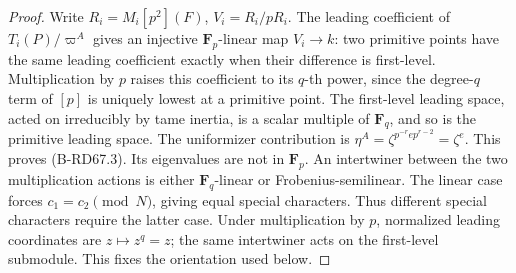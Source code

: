 \begin{proof}
Write \(R_i=M_i[p^2](F)\), \(V_i=R_i/pR_i\). The leading
coefficient of \(T_i(P)/\varpi^A\) gives an injective
\(\mathbf F_p\)-linear map \(V_i\to k\): two primitive points
have the same leading coefficient exactly when their difference
is first-level. Multiplication by \(p\) raises this coefficient
to its \(q\)-th power, since the degree-\(q\) term of \([p]\)
is uniquely lowest at a primitive point. The first-level leading
space, acted on irreducibly by tame inertia, is a scalar multiple
of \(\mathbf F_q\), and so is the primitive leading space.
The uniformizer contribution is
\(\eta^A=\zeta^{p^{-r}e p^{r-2}}=\zeta^e\).
This proves (B-RD67.3). Its eigenvalues are not in \(\mathbf F_p\).
An intertwiner between the two multiplication actions is either
\(\mathbf F_q\)-linear or Frobenius-semilinear. The linear case
forces \(c_1=c_2\pmod N\), giving equal special characters.
Thus different special characters require the latter case.
Under multiplication by \(p\), normalized leading coordinates
are \(z\mapsto z^q=z\); the same intertwiner acts on the
first-level submodule. This fixes the orientation used below.
\end{proof}

